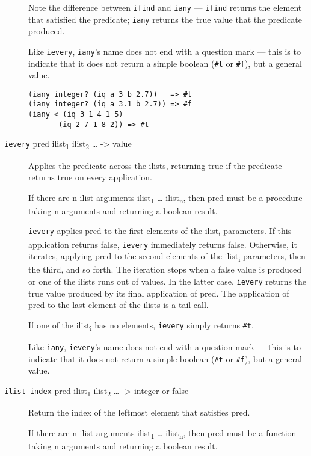 \begin{description}
Note the difference between \texttt{ifind} and \texttt{iany} ---
\texttt{ifind} returns the element that satisfied the predicate;
\texttt{iany} returns the true value that the predicate produced.

Like \texttt{ievery}, \texttt{iany}'s name does not end with a question
mark --- this is to indicate that it does not return a simple boolean
(\texttt{\#t} or \texttt{\#f}), but a general value.

\begin{verbatim}
(iany integer? (iq a 3 b 2.7))   => #t
(iany integer? (iq a 3.1 b 2.7)) => #f
(iany < (iq 3 1 4 1 5)
       (iq 2 7 1 8 2)) => #t
\end{verbatim}
\item[ \href{}{} \texttt{ievery} pred ilist\textsubscript{1}
ilist\textsubscript{2} \ldots{} -\textgreater{} value ]
Applies the predicate across the ilists, returning true if the predicate
returns true on every application.

If there are n ilist arguments ilist\textsubscript{1} \ldots{}
ilist\textsubscript{n}, then pred must be a procedure taking n arguments
and returning a boolean result.

\texttt{ievery} applies pred to the first elements of the
ilist\textsubscript{i} parameters. If this application returns false,
\texttt{ievery} immediately returns false. Otherwise, it iterates,
applying pred to the second elements of the ilist\textsubscript{i}
parameters, then the third, and so forth. The iteration stops when a
false value is produced or one of the ilists runs out of values. In the
latter case, \texttt{ievery} returns the true value produced by its
final application of pred. The application of pred to the last element
of the ilists is a tail call.

If one of the ilist\textsubscript{i} has no elements, \texttt{ievery}
simply returns \texttt{\#t}.

Like \texttt{iany}, \texttt{ievery}'s name does not end with a question
mark --- this is to indicate that it does not return a simple boolean
(\texttt{\#t} or \texttt{\#f}), but a general value.
\item[ \href{}{} \texttt{ilist-index} pred ilist\textsubscript{1}
ilist\textsubscript{2} \ldots{} -\textgreater{} integer or false ]
Return the index of the leftmost element that satisfies pred.

If there are n ilist arguments ilist\textsubscript{1} \ldots{}
ilist\textsubscript{n}, then pred must be a function taking n arguments
and returning a boolean result.


\end{description}
